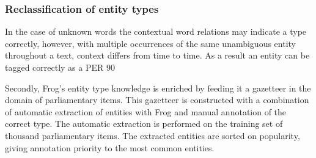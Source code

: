 \subsubsection{Reclassification of entity types}
In the case of unknown words the contextual word relations may indicate a type correctly, however, with multiple occurrences of the same unambiguous entity throughout a text, context differs from time to time. As a result an entity can be tagged correctly as a PER 90%

Secondly, Frog's entity type knowledge is enriched by feeding it a gazetteer in the domain of parliamentary items. This gazetteer is constructed with a combination of automatic extraction of entities with Frog and manual annotation of the correct type. The automatic extraction is performed on the training set of thousand parliamentary items. The extracted entities are sorted on popularity, giving annotation  priority to the most common entities.


